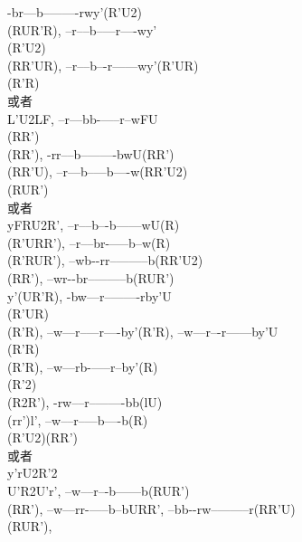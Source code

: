 \documentclass{article}
\begin{document}
{    {-br--}{--b--}{-------rw}{y'(R'U2)\\(RUR'R)}, %
    {--r--}{--b--}{---r----w}{y'\\(R'U2)\\(RR'UR)}, %
    {--r--}{--b--}{-r------w}{y'(R'UR)\\(R'R)\\或者\\L'U2LF}, %
    {--r--}{--bb-}{-----r--w}{FU\\(RR')\\(RR')}, %
    {-rr--}{--b--}{-------bw}{U(RR')\\(RR'U)}, %
    {--r--}{--b--}{---b----w}{(RR'U2)\\(RUR')\\或者\\yFRU2R'}, %
    {--r--}{--b--}{-b------w}{U(R)\\(R'URR')}, %
    {--r--}{--br-}{-----b--w}{(R)\\(R'RUR')}, %
    {--wb-}{-rr--}{--------b}{(RR'U2)\\(RR')}, %
    {--wr-}{-br--}{--------b}{(RUR')\\y'(UR'R)}, %
    {-bw--}{--r--}{-------rb}{y'U\\(R'UR)\\(R'R)}, %
    {--w--}{--r--}{---r----b}{y'(R'R)}, %
    {--w--}{--r--}{-r------b}{y'U\\(R'R)\\(R'R)}, %
    {--w--}{--rb-}{-----r--b}{y'(R)\\(R'2)\\(R2R')}, %
    {-rw--}{--r--}{-------bb}{(lU)\\(rr')l'}, %
    {--w--}{--r--}{---b----b}{(R)\\(R'U2)(RR')\\或者\\y'rU2R'2\\U'R2U'r'}, %
    {--w--}{--r--}{-b------b}{(RUR')\\(RR')}, %
    {--w--}{--rr-}{-----b--b}{URR'}, %
    {--bb-}{-rw--}{--------r}{(RR'U)\\(RUR')}, %
}
\end{document}
